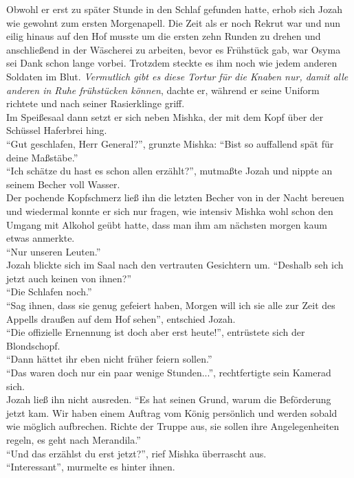 Obwohl er erst zu später Stunde in den Schlaf gefunden hatte, erhob sich Jozah wie gewohnt zum 
ersten Morgenapell. Die Zeit als er noch Rekrut war und nun eilig hinaus auf den Hof musste um die 
ersten zehn Runden zu drehen und anschließend in der Wäscherei zu arbeiten, bevor es Frühstück gab, 
war Osyma sei Dank schon lange vorbei. Trotzdem steckte es ihm noch wie jedem anderen Soldaten im 
Blut. \textit{Vermutlich gibt es diese Tortur für die Knaben nur, damit alle anderen in Ruhe 
frühstücken können}, dachte er, während er seine Uniform richtete und nach seiner Rasierklinge 
griff.\\
Im Speißesaal dann setzt er sich neben Mishka, der mit dem Kopf über der Schüssel Haferbrei hing.\\
``Gut geschlafen, Herr General?'', grunzte Mishka: ``Bist so auffallend spät für deine Maßstäbe.''\\
``Ich schätze du hast es schon allen erzählt?'', mutmaßte Jozah und nippte an seinem Becher voll 
Wasser.\\
Der pochende Kopfschmerz ließ ihn die letzten Becher von in der Nacht bereuen und wiedermal konnte 
er sich nur fragen, wie intensiv Mishka wohl schon den Umgang mit Alkohol geübt hatte, dass man ihm 
am nächsten morgen kaum etwas anmerkte.\\
``Nur unseren Leuten.''\\
Jozah blickte sich im Saal nach den vertrauten Gesichtern um. ``Deshalb seh ich jetzt auch keinen 
von ihnen?''\\
``Die Schlafen noch.''\\
``Sag ihnen, dass sie genug gefeiert haben, Morgen will ich sie alle zur Zeit des Appells draußen 
auf dem Hof sehen'', entschied Jozah.\\
``Die offizielle Ernennung ist doch aber erst heute!'', entrüstete sich der Blondschopf.\\
``Dann hättet ihr eben nicht früher feiern sollen.''\\
``Das waren doch nur ein paar wenige Stunden...'', rechtfertigte sein Kamerad sich.\\
Jozah ließ ihn nicht ausreden. ``Es hat seinen Grund, warum die Beförderung jetzt kam. Wir haben 
einem Auftrag vom König persönlich und werden sobald wie möglich aufbrechen. Richte der Truppe aus, 
sie sollen ihre Angelegenheiten regeln, es geht nach Merandila.''\\
``Und das erzählst du erst jetzt?'', rief Mishka überrascht aus.\\
``Interessant'', murmelte es hinter ihnen.\\
